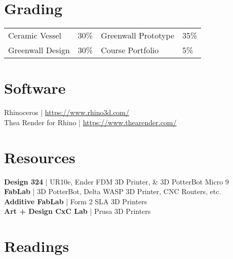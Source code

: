 \documentclass[11pt,article,oneside]{memoir}
\begin{document}
\section{Grading}
%
\begin{table}[H]
\begin{tabular}{l r @{\hskip 2cm} l @{\hskip 0.5cm} l}
%
Ceramic Vessel & 30\% & Greenwall Prototype & 35\% \\
Greenwall Design & 30\% & Course Portfolio & 5\% \\
%
\end{tabular}
\end{table}

\section{Software}
Rhinoceros | \url{https://www.rhino3d.com/}\\
Thea Render for Rhino | \url{https://www.thearender.com/}\\


\section{Resources}
\textbf{Design 324} | UR10e, Ender FDM 3D Printer, \& 3D PotterBot Micro 9\\
\textbf{FabLab} | 3D PotterBot, Delta WASP 3D Printer, CNC Routers, etc.\\
\textbf{Additive FabLab} | Form 2 SLA 3D Printers\\
\textbf{Art + Design CxC Lab} | Prusa 3D Printers\\


\section{Readings}
\vspace*{0.5cm}
\nocite{*}
\setlength{}
\printbibliography[heading=none]

\clearpage

\end{document}
